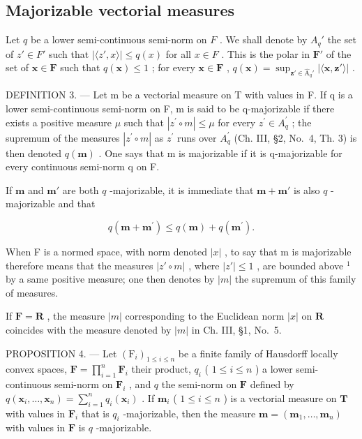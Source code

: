 \subsection{Majorizable vectorial measures}

Let \(q\) be a lower semi-continuous semi-norm on \(F\) . We shall denote by \(A_q'\) the set of \(z' \in F'\) such that \(|\langle z', x \rangle| \leqslant q(x)\) for all \(x \in F\) . This is the polar in \(\mathbf{F}'\) of the set of \(\mathbf{x} \in \mathbf{F}\) such that \(q(\mathbf{x}) \leqslant 1\) ; for every \(\mathbf{x} \in \mathbf{F}\) , \(q(\mathbf{x}) = \sup_{\mathbf{z}' \in \hat{\mathrm{A}}_q'} |\langle \mathbf{x}, \mathbf{z}' \rangle|\) .

DEFINITION 3. --- Let m be a vectorial measure on T with values in F. If q is a lower semi-continuous semi-norm on F, m is said to be q-majorizable if there exists a positive measure \(\mu\) such that \(|z^{\prime} \circ m| \leqslant \mu\) for every \(z^{\prime} \in A_{q}^{\prime}\) ; the supremum of the measures \(|z^{\prime} \circ m|\) as \(z^{\prime}\) runs over \(A_{q}^{\prime}\) (Ch. III, §2, No.~4, Th. 3) is then denoted \(q(\mathbf{m})\) . One says that m is majorizable if it is q-majorizable for every continuous semi-norm q on F.

If \(\mathbf{m}\) and \(\mathbf{m}'\) are both \(q\) -majorizable, it is immediate that \(\mathbf{m} + \mathbf{m}'\) is also \(q\) -majorizable and that

\[
q (\mathbf {m} + \mathbf {m} ^ {\prime}) \leqslant q (\mathbf {m}) + q (\mathbf {m} ^ {\prime}).
\]

When F is a normed space, with norm denoted \(|x|\) , to say that m is majorizable therefore means that the measures \(|z'\circ m|\) , where \(|z'| \leqslant 1\) , are bounded above \(^{1}\) by a same positive measure; one then denotes by \(|m|\) the supremum of this family of measures.

If \(\mathbf{F} = \mathbf{R}\) , the measure \(|m|\) corresponding to the Euclidean norm \(|x|\) on \(\mathbf{R}\) coincides with the measure denoted by \(|m|\) in Ch. III, §1, No.~5.

PROPOSITION 4. --- Let \((\mathrm{F}_i)_{1 \leqslant i \leqslant n}\) be a finite family of Hausdorff locally convex spaces, \(\mathbf{F} = \prod_{i=1}^{n} \mathbf{F}_i\) their product, \(q_i\) ( \(1 \leqslant i \leqslant n\) ) a lower semi-continuous semi-norm on \(\mathbf{F}_i\) , and \(q\) the semi-norm on \(\mathbf{F}\) defined by \(q(\mathbf{x}_i, \ldots, \mathbf{x}_n) = \sum_{i=1}^{n} q_i(\mathbf{x}_i)\) . If \(\mathbf{m}_i\) ( \(1 \leqslant i \leqslant n\) ) is a vectorial measure on \(\mathbf{T}\) with values in \(\mathbf{F}_i\) that is \(q_i\) -majorizable, then the measure \(\mathbf{m} = (\mathbf{m}_1, \ldots, \mathbf{m}_n)\) with values in \(\mathbf{F}\) is \(q\) -majorizable.

